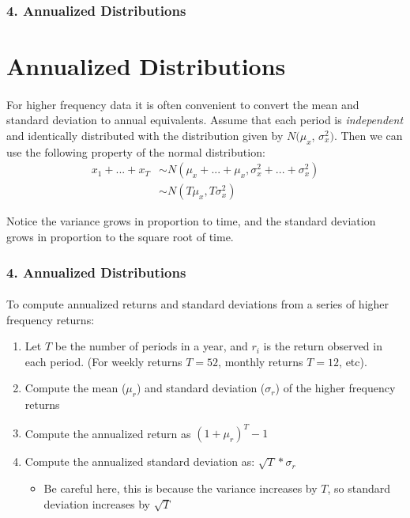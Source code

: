 \documentclass{beamer}
\begin{document}
\begin{frame}[t]
    \frametitle{4. Annualized Distributions}
    \section{Annualized Distributions}
    \framesubtitle{}

    For higher frequency data it is often convenient to 
    convert the mean and standard deviation to annual equivalents.  Assume that each period is \textit{independent} and identically distributed with the distribution given by $N(\mu_x$, $\sigma_x^2)$.  Then we can use the following property of the normal distribution:
    \begin{align*}
    x_1 +... + x_T &\sim N(\mu_x+...+\mu_x,\sigma_x^2 +...+ \sigma_x^2)\\
                    &\sim N(T\mu_x,T\sigma_x^2)
    \end{align*}

    Notice the variance grows in proportion to time, and the standard deviation grows in proportion to the square root of time. 

\end{frame}

\begin{frame}[t]
    \frametitle{4. Annualized Distributions}
    \framesubtitle{}

    To compute annualized returns and standard deviations from a series of higher frequency returns:
    \begin{enumerate}
        \item Let $T$ be the number of periods in a year, and $r_i$ is the return observed in each period. (For weekly returns $T=52$, monthly returns $T=12$, etc). 
        \item Compute the mean ($\mu_r$) and standard deviation ($\sigma_r$) of the higher frequency returns
        \item Compute the annualized return as $(1+\mu_r)^T - 1$
        \item Compute the annualized standard deviation as: $\sqrt{T}*\sigma_r$
        \begin{itemize}
            \item Be careful here, this is because the variance increases by $T$,
            so standard deviation increases by $\sqrt{T}$
        \end{itemize}
    \end{enumerate}
    \vspace{1em}

\end{frame}
\end{document}
